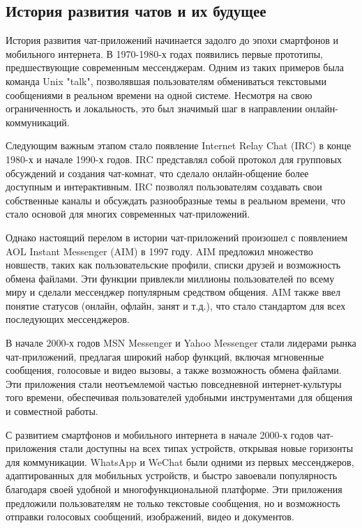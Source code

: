 \subsection{История развития чатов и их будущее}

История развития чат-приложений начинается задолго до эпохи смартфонов и мобильного интернета. В 1970-1980-х годах появились первые прототипы, предшествующие современным мессенджерам. Одним из таких примеров была команда Unix "talk", позволявшая пользователям обмениваться текстовыми сообщениями в реальном времени на одной системе. Несмотря на свою ограниченность и локальность, это был значимый шаг в направлении онлайн-коммуникаций.

Следующим важным этапом стало появление Internet Relay Chat (IRC) в конце 1980-х и начале 1990-х годов. IRC представлял собой протокол для групповых обсуждений и создания чат-комнат, что сделало онлайн-общение более доступным и интерактивным. IRC позволял пользователям создавать свои собственные каналы и обсуждать разнообразные темы в реальном времени, что стало основой для многих современных чат-приложений.

Однако настоящий перелом в истории чат-приложений произошел с появлением AOL Instant Messenger (AIM) в 1997 году. AIM предложил множество новшеств, таких как пользовательские профили, списки друзей и возможность обмена файлами. Эти функции привлекли миллионы пользователей по всему миру и сделали мессенджер популярным средством общения. AIM также ввел понятие статусов (онлайн, офлайн, занят и т.д.), что стало стандартом для всех последующих мессенджеров.

В начале 2000-х годов MSN Messenger и Yahoo Messenger стали лидерами рынка чат-приложений, предлагая широкий набор функций, включая мгновенные сообщения, голосовые и видео вызовы, а также возможность обмена файлами. Эти приложения стали неотъемлемой частью повседневной интернет-культуры того времени, обеспечивая пользователей удобными инструментами для общения и совместной работы.

С развитием смартфонов и мобильного интернета в начале 2000-х годов чат-приложения стали доступны на всех типах устройств, открывая новые горизонты для коммуникации. WhatsApp и WeChat были одними из первых мессенджеров, адаптированных для мобильных устройств, и быстро завоевали популярность благодаря своей удобной и многофункциональной платформе. Эти приложения предложили пользователям не только текстовые сообщения, но и возможность отправки голосовых сообщений, изображений, видео и документов.

